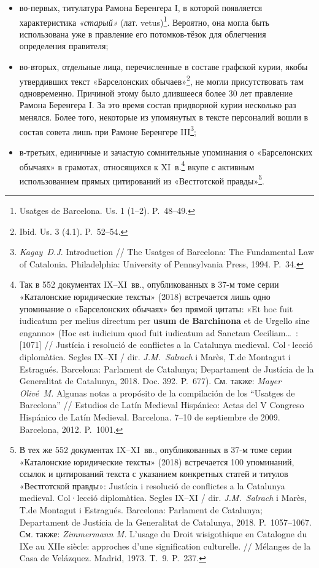 \begin{itemize}
\item во-первых, титулатура Рамона Беренгера I, в которой появляется характеристика \emph{«старый}\emph{»} (лат. vetus)\footnote{Usatges de Barcelona. Us. 1 (1--2). P.~48--49.}. Вероятно, она могла быть использована уже в правление его потомков-тёзок для облегчения определения правителя;
\item во-вторых, отдельные лица, перечисленные в составе графской курии, якобы утвердивших текст «Барселонских обычаев»\footnote{Ibid. Us. 3 (4.1). P.~52--54.}, не могли присутствовать там одновременно. Причиной этому было длившееся более 30 лет правление Рамона Беренгера I. За это время состав придворной курии несколько раз менялся. Более того, некоторые из упомянутых в тексте персоналий вошли в состав совета лишь при Рамоне Беренгере III\footnote{\emph{Kagay~D.J}. Introduction // The Usatges of Barcelona: The Fundamental Law of Catalonia. Philadelphia: University of Pennsylvania Press, 1994. P.~34.};
\item в-третьих, единичные и зачастую сомнительные упоминания о «Барселонских обычаях» в грамотах, относящихся к XI~в.\footnote{Так в 552 документах IX--XI~вв., опубликованных в 37-м томе серии «Каталонские юридические тексты» (2018) встречается лишь одно упоминание о «Барселонских обычаях» без прямой цитаты: «Et hoc fuit iudicatum per melius directum per \textbf{usum}\textbf{ de }\textbf{Barchinona} et de Urgello sine enganno» (Hoc est iudicium quod fuit iudicatum ad Sanctam Ceciliam…~: [1071] // Justícia i resolució de conflictes a la Catalunya medieval. Col·lecció diplomàtica. Segles IX--XI / dir. \emph{J.M.~Salrach} i Marès, T.de Montagut i Estragués. Barcelona: Parlament de Catalunya; Departament de Justícia de la Generalitat de Catalunya, 2018. Doc. 392. P.~677). См. также: \emph{Mayer Olivé~M.} Algunas notas a propósito de la compilación de los “Usatges de Barcelona” // Estudios de Latín Medieval Hispánico: Actas del V Congreso Hispánico de Latín Medieval. Barcelona. 7--10 de septiembre de 2009. Barcelona, 2012. P.~1001.} вкупе с активным использованием прямых цитирований из «Вестготской правды»\footnote{В тех же 552 документах IX--XI~вв., опубликованных в 37-м томе серии «Каталонские юридические тексты» (2018) встречается 100 упоминаний, ссылок и цитирований текста с указанием конкретных статей и титулов «Вестготской правды»: Justícia i resolució de conflictes a la Catalunya medieval. Col·lecció diplomàtica. Segles IX--XI / dir. \emph{J.M.~Salrach} i Marès, T.de Montagut i Estragués. Barcelona: Parlament de Catalunya; Departament de Justícia de la Generalitat de Catalunya, 2018. P.~1057--1067. См. также: \emph{Zimmermann M.} L’usage du Droit wisigothique en Catalogne du IXe au XIIe siècle: approches d’une signification culturelle. // Mélanges de la Casa de Velázquez. Madrid, 1973. T.~9. P.~237.}.
\end{itemize}
